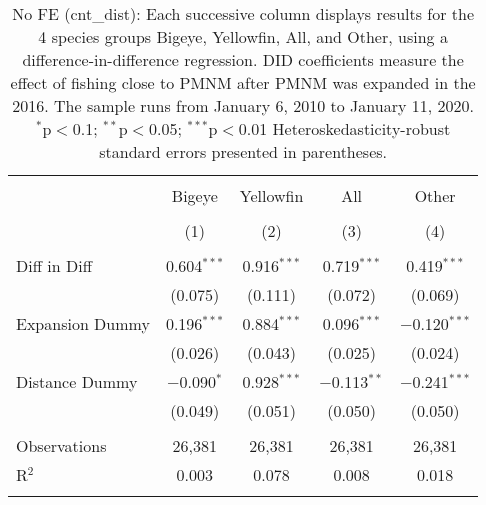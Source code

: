 
\begin{table}[!htbp] \centering 
  \caption{No FE (cnt_dist): Each successive column displays results for the 4 species groups Bigeye, Yellowfin, All, and Other, using a difference-in-difference regression. DID coefficients measure the effect of fishing close to PMNM after PMNM was expanded in the 2016. The sample runs from January 6, 2010 to January 11, 2020. $^{*}$p$<$0.1; $^{**}$p$<$0.05; $^{***}$p$<$0.01 Heteroskedasticity-robust standard errors presented in parentheses.} 
  \label{tbl:noFEcnt_dist} 
\begin{tabular}{@{\extracolsep{5pt}}lcccc} 
\\[-1.8ex]\hline 
\hline \\[-1.8ex] 
 & Bigeye & Yellowfin & All & Other \\ 
\\[-1.8ex] & (1) & (2) & (3) & (4)\\ 
\hline \\[-1.8ex] 
 Diff in Diff & 0.604$^{***}$ & 0.916$^{***}$ & 0.719$^{***}$ & 0.419$^{***}$ \\ 
  & (0.075) & (0.111) & (0.072) & (0.069) \\ 
  Expansion Dummy & 0.196$^{***}$ & 0.884$^{***}$ & 0.096$^{***}$ & $-$0.120$^{***}$ \\ 
  & (0.026) & (0.043) & (0.025) & (0.024) \\ 
  Distance Dummy & $-$0.090$^{*}$ & 0.928$^{***}$ & $-$0.113$^{**}$ & $-$0.241$^{***}$ \\ 
  & (0.049) & (0.051) & (0.050) & (0.050) \\ 
 \hline \\[-1.8ex] 
Observations & 26,381 & 26,381 & 26,381 & 26,381 \\ 
R$^{2}$ & 0.003 & 0.078 & 0.008 & 0.018 \\ 
\hline 
\hline \\[-1.8ex] 
\end{tabular} 
\end{table} 
